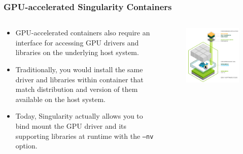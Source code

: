 \documentclass{beamer}
\begin{document}
\begin{frame}
   \frametitle{GPU-accelerated Singularity Containers}
   \begin{columns}
      \begin{column}{0.6\textwidth}
         \begin{itemize}
            \setlength\itemsep{1.0em}
            \item GPU-accelerated containers also require an interface 
               for accessing GPU drivers and libraries on the underlying 
               host system.
            \item Traditionally, you would install the same driver and 
               libraries within container that match distribution and version
               of them available on the host system.
            \item Today, Singularity actually allows you to bind mount 
               the GPU driver and its supporting libraries at runtime 
               with the \texttt{--nv} option. 
         \end{itemize}
      \end{column}
      \hfill
      \begin{column}{0.5\textwidth}
         \begin{figure}[htbp]
            \includegraphics[width=1.0\textwidth]{images/nvidia-docker-stack+singularity.png}
         \end{figure}
      \end{column}
   \end{columns}
\end{frame}
\end{document}
